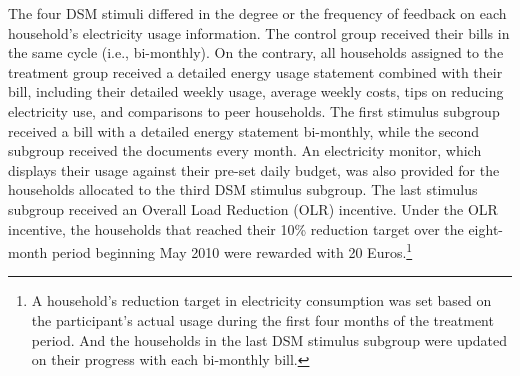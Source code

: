 The four DSM stimuli differed in the degree or the frequency of feedback on each household's electricity usage information. The control group received their bills in the same cycle (i.e., bi-monthly). On the contrary, all households assigned to the treatment group received a detailed energy usage statement combined with their bill, including their detailed weekly usage, average weekly costs, tips on reducing electricity use, and comparisons to peer households. The first stimulus subgroup received a bill with a detailed energy statement bi-monthly, while the second subgroup received the documents every month. An electricity monitor, which displays their usage against their pre-set daily budget, was also provided for the households allocated to the third DSM stimulus subgroup. The last stimulus subgroup received an Overall Load Reduction (OLR) incentive. Under the OLR incentive, the households that reached their 10\% reduction target over the eight-month period beginning May 2010 were rewarded with 20 Euros.\footnote{A household's reduction target in electricity consumption was set based on the participant's actual usage during the first four months of the treatment period. And the households in the last DSM stimulus subgroup were updated on their progress with each bi-monthly bill.}
